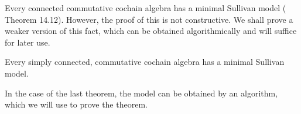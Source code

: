\begin{Remark}
\label{rem:MinimalSullivanModelsExist}
Every connected commutative cochain algebra has a minimal Sullivan model
(\cite{Felix2001} Theorem 14.12). However, the proof of this is not constructive. We shall prove a weaker 
version of this fact, which can be obtained algorithmically and will suffice for later use.
\end{Remark}

\begin{Theorem}
\label{thm:MinimalSullivanModelsExistForSimplyConnected}
 Every simply connected, commutative cochain algebra has a minimal Sullivan model.
\end{Theorem}

In the case of the last theorem, the model can be obtained by an algorithm, which we will use to prove the theorem.

